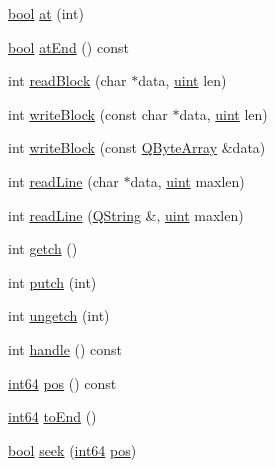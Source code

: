 \begin{DoxyCompactItemize}
\item 
\hyperlink{qglobal_8h_a1062901a7428fdd9c7f180f5e01ea056}{bool} \hyperlink{class_q_file_aa2f5e380a549e7d3043cf41ac8c57eba}{at} (int)
\item 
\hyperlink{qglobal_8h_a1062901a7428fdd9c7f180f5e01ea056}{bool} \hyperlink{class_q_file_a5e18b20b642940db9e23fe211a57ce9e}{at\+End} () const 
\item 
int \hyperlink{class_q_file_ab9a42e65a2fcd51bae5f2a186ff5bee5}{read\+Block} (char $\ast$data, \hyperlink{qglobal_8h_a4d3943ddea65db7163a58e6c7e8df95a}{uint} len)
\item 
int \hyperlink{class_q_file_a47e0572e396a6e953d14ba69bf733cea}{write\+Block} (const char $\ast$data, \hyperlink{qglobal_8h_a4d3943ddea65db7163a58e6c7e8df95a}{uint} len)
\item 
int \hyperlink{class_q_file_a04e15f86aa48622ddb7c7e81c7cc7613}{write\+Block} (const \hyperlink{qcstring_8h_ad6a390648110655c217fe072d45fbcf5}{Q\+Byte\+Array} \&data)
\item 
int \hyperlink{class_q_file_af95c756ce6ff9f597ff1d21c8384d777}{read\+Line} (char $\ast$data, \hyperlink{qglobal_8h_a4d3943ddea65db7163a58e6c7e8df95a}{uint} maxlen)
\item 
int \hyperlink{class_q_file_a324c017d391658a8eacf5b35932f5f87}{read\+Line} (\hyperlink{class_q_string}{Q\+String} \&, \hyperlink{qglobal_8h_a4d3943ddea65db7163a58e6c7e8df95a}{uint} maxlen)
\item 
int \hyperlink{class_q_file_a1c18e1a16e6f92ba8f19177824707f78}{getch} ()
\item 
int \hyperlink{class_q_file_af331c4e27024f12383958e65c6a828a3}{putch} (int)
\item 
int \hyperlink{class_q_file_afb01a04cda09b3cc61babb5d334a052c}{ungetch} (int)
\item 
int \hyperlink{class_q_file_a22ddaca9166daa9d390edb0d14397033}{handle} () const 
\item 
\hyperlink{qglobal_8h_aecfc3c54bd29ad5964e1c1c3ccbf89df}{int64} \hyperlink{class_q_file_a4f36a1ed8332ce2eafb0852981ef7a1d}{pos} () const 
\item 
\hyperlink{qglobal_8h_aecfc3c54bd29ad5964e1c1c3ccbf89df}{int64} \hyperlink{class_q_file_af5a806623250b78c5aa02a10b16effc7}{to\+End} ()
\item 
\hyperlink{qglobal_8h_a1062901a7428fdd9c7f180f5e01ea056}{bool} \hyperlink{class_q_file_affb1708c3feb5bb734f4486a7bcced1a}{seek} (\hyperlink{qglobal_8h_aecfc3c54bd29ad5964e1c1c3ccbf89df}{int64} \hyperlink{class_q_file_a4f36a1ed8332ce2eafb0852981ef7a1d}{pos})
\end{DoxyCompactItemize}
